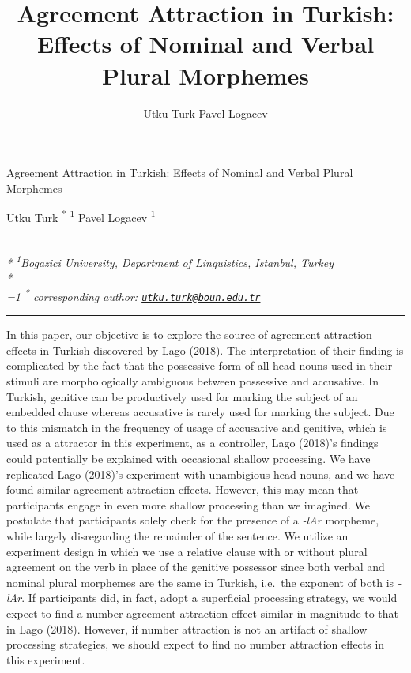 \documentclass[11pt,a4paper]{article}
\title{Agreement Attraction in Turkish: Effects of Nominal and Verbal Plural
Morphemes}
\author{
Utku Turk
Pavel Logacev
}
\date{}
\begin{document}
\begin{singlespace}
\begin{center}
\huge Agreement Attraction in Turkish: Effects of Nominal and Verbal Plural
Morphemes
\end{center}
\begin{center}
\large
Utku Turk \textsuperscript{*} \textsuperscript{1} 
Pavel Logacev \textsuperscript{1} 
\end{center}
\begin{justify}
\footnotesize \emph{ 
\\*
\textsuperscript{1}Bogazici University, Department of Linguistics, Istanbul, Turkey\\*
}
\setcounter{num}{1}
\\[0.1cm]
\footnotesize \emph{ 
\ifnum\value{num}=1%
\textsuperscript{*} corresponding author:
\fi
\href{mailto:utku.turk@boun.edu.tr}{\nolinkurl{utku.turk@boun.edu.tr}}
}
\end{justify}
\normalsize

\end{singlespace}


\vspace{2mm}\hrule

In this paper, our objective is to explore the source of agreement
attraction effects in Turkish discovered by Lago (2018). The
interpretation of their finding is complicated by the fact that the
possessive form of all head nouns used in their stimuli are
morphologically ambiguous between possessive and accusative. In Turkish,
genitive can be productively used for marking the subject of an embedded
clause whereas accusative is rarely used for marking the subject. Due to
this mismatch in the frequency of usage of accusative and genitive,
which is used as a attractor in this experiment, as a controller, Lago
(2018)'s findings could potentially be explained with occasional shallow
processing. We have replicated Lago (2018)'s experiment with unambigious
head nouns, and we have found similar agreement attraction effects.
However, this may mean that participants engage in even more shallow
processing than we imagined. We postulate that participants solely check
for the presence of a \emph{-lAr} morpheme, while largely disregarding
the remainder of the sentence. We utilize an experiment design in which
we use a relative clause with or without plural agreement on the verb in
place of the genitive possessor since both verbal and nominal plural
morphemes are the same in Turkish, i.e.~the exponent of both is
\emph{-lAr}. If participants did, in fact, adopt a superficial
processing strategy, we would expect to find a number agreement
attraction effect similar in magnitude to that in Lago (2018). However,
if number attraction is not an artifact of shallow processing
strategies, we should expect to find no number attraction effects in
this experiment.
\end{document}
